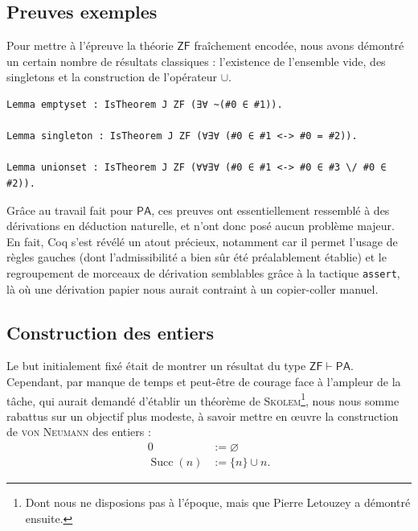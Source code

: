 \documentclass[a4paper]{article}
\DeclareMathOperator{\Succ}{\mathrm{Succ}}
\newcommand{\PA}{\mathsf{PA}}
\newcommand{\ZF}{\mathsf{ZF}}
\begin{document}
\subsection{Preuves exemples} \label{ex}

Pour mettre à l'épreuve la théorie $\ZF$ fraîchement encodée, nous avons démontré un certain nombre de résultats classiques : l'existence de l'ensemble vide, des singletons et la construction de l'opérateur $\cup$.
\begin{verbatim}
Lemma emptyset : IsTheorem J ZF (∃∀ ~(#0 ∈ #1)).

Lemma singleton : IsTheorem J ZF (∀∃∀ (#0 ∈ #1 <-> #0 = #2)).

Lemma unionset : IsTheorem J ZF (∀∀∃∀ (#0 ∈ #1 <-> #0 ∈ #3 \/ #0 ∈ #2)).
\end{verbatim}

Grâce au travail fait pour $\PA$, ces preuves ont essentiellement ressemblé à des dérivations en déduction naturelle, et n'ont donc posé aucun problème majeur. En fait, Coq s'est révélé un atout précieux, notamment car il permet l'usage de règles gauches (dont l'admissibilité a bien sûr été préalablement établie) et le regroupement de morceaux de dérivation semblables grâce à la tactique \verb+assert+, là où une dérivation papier nous aurait contraint à un copier-coller manuel.

\subsection{Construction des entiers}

Le but initialement fixé était de montrer un résultat du type $\ZF \vdash \PA$. Cependant, par manque de temps et peut-être de courage face à l'ampleur de la tâche, qui aurait demandé d'établir un théorème de \textsc{Skolem}\footnote{Dont nous ne disposions pas à l'époque, mais que Pierre Letouzey a démontré ensuite.}, nous nous somme rabattus sur un objectif plus modeste, à savoir mettre en \oe uvre la construction de \textsc{von Neumann} des entiers :
\begin{align*}
0 &:= \varnothing \\
\Succ (n) &:= \{ n \} \cup n.
\end{align*}
\end{document}
